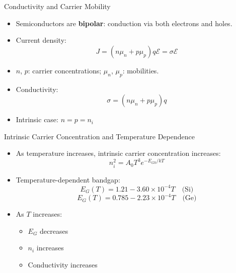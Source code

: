 \begin{frame}{Conductivity and Carrier Mobility}
    \begin{itemize}
        \item Semiconductors are \textbf{bipolar}: conduction via both electrons and holes.
        \item Current density:
        \begin{equation}
        J = (n \mu_n + p \mu_p)q\mathcal{E} = \sigma \mathcal{E} \tag{2-16}
        \end{equation}
        \item $n$, $p$: carrier concentrations; $\mu_n$, $\mu_p$: mobilities.
        \item Conductivity:
        \begin{equation}
        \sigma = (n \mu_n + p \mu_p)q \tag{2-17}
        \end{equation}
        \item Intrinsic case: $n = p = n_i$
    \end{itemize}
\end{frame}

\begin{frame}{Intrinsic Carrier Concentration and Temperature Dependence}
    \begin{itemize}
        \item As temperature increases, intrinsic carrier concentration increases:
        \begin{equation}
        n_i^2 = A_0 T^3 e^{-E_{G0}/kT} \tag{2-18}
        \end{equation}
        \item Temperature-dependent bandgap:
        \begin{equation}
        E_G(T) = 1.21 - 3.60 \times 10^{-4}T \quad \text{(Si)} \tag{2-19}
        \end{equation}
        \begin{equation}
        E_G(T) = 0.785 - 2.23 \times 10^{-4}T \quad \text{(Ge)} \tag{2-20}
        \end{equation}
        \item As $T$ increases:
        \begin{itemize}
            \item $E_G$ decreases
            \item $n_i$ increases
            \item Conductivity increases
        \end{itemize}
    \end{itemize}
\end{frame}


